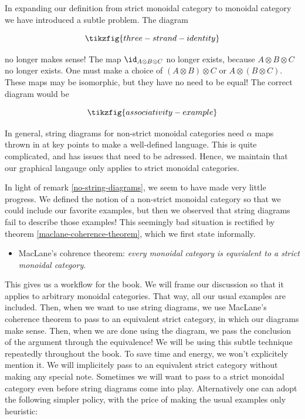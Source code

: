 \begin{rem}\label{no-string-diagrams}
In expanding our definition from strict monoidal category to monoidal category we have introduced a subtle problem. The diagram

\begin{equation*}
\tikzfig{three-strand-identity}
\end{equation*}

no longer makes sense! The map $\id_{A\otimes B\otimes C}$ no longer exists, because $A\otimes B \otimes C$ no longer exists. One must make a choice of $(A\otimes B)\otimes C$ or $A\otimes (B\otimes C)$. These maps may be isomorphic, but they have no need to be equal! The correct diagram would be

\begin{equation*}
\tikzfig{associativity-example}
\end{equation*}

In general, string diagrams for non-strict monoidal categories need $\alpha$ maps thrown in at key points to make a well-defined language. This is quite complicated, and has issues that need to be adressed. Hence, we maintain that our graphical langauge only applies to strict monoidal categories.
\end{rem}

\begin{rem}\label{monoidal-category-workflow}
In light of remark \ref{no-string-diagrams}, we seem to have made very little progress. We defined the notion of a non-strict monoidal category so that we could include our favorite examples, but then we observed that string diagrams fail to describe those examples!  This seemingly bad situation is rectified by theorem \ref{maclane-coherence-theorem}, which we first state informally.

\begin{itemize}
\item MacLane's cohrence theorem: {\em every monoidal category is equvialent to a strict monoidal category}.
\end{itemize}

This gives us a workflow for the book. We will frame our discussion so that it applies to arbitrary monoidal categories. That way, all our usual examples are included. Then, when we want to use string diagrams, we use MacLane's coherence theorem to pass to an equivalent strict category, in which our diagrams make sense. Then, when we are done using the diagram, we pass the conclusion of the argument through the equivalence! We will be using this subtle technique repeatedly throughout the book. To save time and energy, we won't explicitely mention it. We will implicitely pass to an equivalent strict category without making any special note. Sometimes we will want to pass to a strict monoidal category even before string diagrams come into play. Alternatively one can adopt the following simpler policy, with the price of making the usual examples only heuristic:

\begin{center}
\end{center}
\end{rem}

